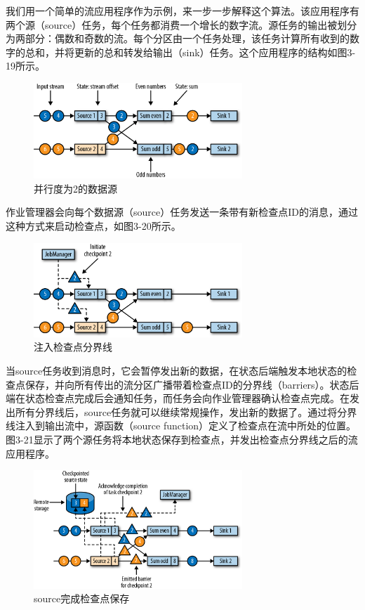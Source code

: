 \documentclass[cn,11pt,chinese]{elegantbook}
\begin{document}
我们用一个简单的流应用程序作为示例，来一步一步解释这个算法。该应用程序有两个源（source）任务，每个任务都消费一个增长的数字流。源任务的输出被划分为两部分：偶数和奇数的流。每个分区由一个任务处理，该任务计算所有收到的数字的总和，并将更新的总和转发给输出（sink）任务。这个应用程序的结构如图3-19所示。

\begin{figure}[htbp]
    \centering
    \includegraphics[width=0.7\textwidth]{images/spaf_0319.png}
    \caption{并行度为2的数据源}
\end{figure}

作业管理器会向每个数据源（source）任务发送一条带有新检查点ID的消息，通过这种方式来启动检查点，如图3-20所示。

\begin{figure}[htbp]
    \centering
    \includegraphics[width=0.7\textwidth]{images/spaf_0320.png}
    \caption{注入检查点分界线}
\end{figure}

当source任务收到消息时，它会暂停发出新的数据，在状态后端触发本地状态的检查点保存，并向所有传出的流分区广播带着检查点ID的分界线（barriers）。状态后端在状态检查点完成后会通知任务，而任务会向作业管理器确认检查点完成。在发出所有分界线后，source任务就可以继续常规操作，发出新的数据了。通过将分界线注入到输出流中，源函数（source function）定义了检查点在流中所处的位置。图3-21显示了两个源任务将本地状态保存到检查点，并发出检查点分界线之后的流应用程序。

\begin{figure}[htbp]
    \centering
    \includegraphics[width=0.7\textwidth]{images/spaf_0321.png}
    \caption{source完成检查点保存}
\end{figure}
\end{document}
